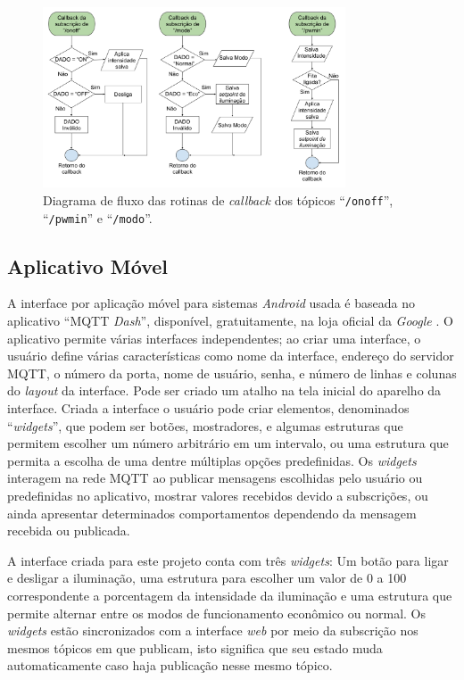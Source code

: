 \begin{figure}[ht]
    \begin{center}
    \includegraphics[width=0.8\textwidth]{figuras/flux_cb.png}
    \end{center}
    \caption[Diagrama de fluxo das rotinas de \textit{callback}.]{Diagrama de fluxo das rotinas de \textit{callback} dos tópicos ``\texttt{/onoff}'', ``\texttt{/pwmin}'' e ``\texttt{/modo}''.}
    \label{fcb}
\end{figure}

\subsection{Aplicativo Móvel}

A interface por aplicação móvel para sistemas \textit{Android} usada é baseada no aplicativo ``MQTT \textit{Dash}'', disponível, gratuitamente, na loja oficial da \textit{Google} \cite{dash}. O aplicativo permite várias interfaces independentes; ao criar uma interface, o usuário define várias características como nome da interface, endereço do servidor MQTT, o número da porta, nome de usuário, senha, e número de linhas e colunas do \textit{layout} da interface. Pode ser criado um atalho na tela inicial do aparelho da interface. Criada a interface o usuário pode criar elementos, denominados ``\textit{widgets}'', que podem ser botões, mostradores, e algumas estruturas que permitem escolher um número arbitrário em um intervalo, ou uma estrutura que permita a escolha de uma dentre múltiplas opções predefinidas. Os \textit{widgets} interagem na rede MQTT ao publicar mensagens escolhidas pelo usuário ou predefinidas no aplicativo, mostrar valores recebidos devido a subscrições, ou ainda apresentar determinados comportamentos dependendo da mensagem recebida ou publicada.

A interface criada para este projeto conta com três \textit{widgets}: Um botão para ligar e desligar a iluminação, uma estrutura para escolher um valor de 0 a 100 correspondente a porcentagem da intensidade da iluminação e uma estrutura que permite alternar entre os modos de funcionamento econômico ou normal. Os \textit{widgets} estão sincronizados com a interface \textit{web} por meio da subscrição nos mesmos tópicos em que publicam, isto significa que seu estado muda automaticamente caso haja publicação nesse mesmo tópico.

